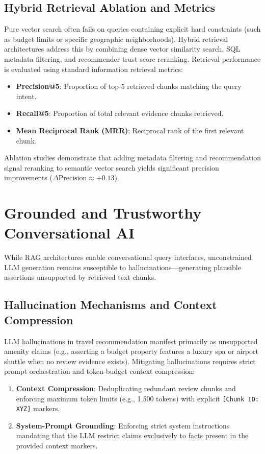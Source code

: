 \subsection{Hybrid Retrieval Ablation and Metrics}
Pure vector search often fails on queries containing explicit hard constraints (such as budget limits or specific geographic neighborhoods). Hybrid retrieval architectures address this by combining dense vector similarity search, SQL metadata filtering, and recommender trust score reranking. Retrieval performance is evaluated using standard information retrieval metrics:
\begin{itemize}
    \item \textbf{Precision@5}: Proportion of top-5 retrieved chunks matching the query intent.
    \item \textbf{Recall@5}: Proportion of total relevant evidence chunks retrieved.
    \item \textbf{Mean Reciprocal Rank (MRR)}: Reciprocal rank of the first relevant chunk.
\end{itemize}

Ablation studies demonstrate that adding metadata filtering and recommendation signal reranking to semantic vector search yields significant precision improvements ($\Delta \text{Precision} \approx +0.13$).

\section{Grounded and Trustworthy Conversational AI}
While RAG architectures enable conversational query interfaces, unconstrained LLM generation remains susceptible to hallucinations—generating plausible assertions unsupported by retrieved text chunks.

\subsection{Hallucination Mechanisms and Context Compression}
LLM hallucinations in travel recommendation manifest primarily as unsupported amenity claims (e.g., asserting a budget property features a luxury spa or airport shuttle when no review evidence exists). Mitigating hallucinations requires strict prompt orchestration and token-budget context compression:
\begin{enumerate}
    \item \textbf{Context Compression}: Deduplicating redundant review chunks and enforcing maximum token limits (e.g., 1,500 tokens) with explicit \texttt{[Chunk ID: XYZ]} markers.
    \item \textbf{System-Prompt Grounding}: Enforcing strict system instructions mandating that the LLM restrict claims exclusively to facts present in the provided context markers.
\end{enumerate}

